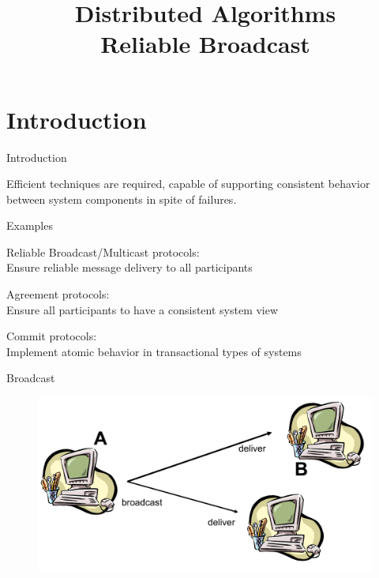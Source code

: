 
\title[DS - Reliable Broadcast]{\textbf{Distributed Algorithms}\\Reliable Broadcast}

\graphicspath{{figs/04/}}



\FrameTitle{}
\FrameContent

\section{Introduction}

\begin{frame}{Introduction}

Efficient techniques are required, capable of supporting consistent behavior 
between system components in spite of failures.

\bigskip
\begin{block}{Examples}
\BIL
\item  \alert{Reliable Broadcast/Multicast protocols}:\\
Ensure reliable message delivery to all participants 
\item Agreement protocols:\\
Ensure all participants to have a consistent system view 
\item Commit protocols:\\
Implement atomic behavior in transactional types of systems
\EIL
\end{block}

\end{frame}

\begin{frame}{Broadcast}
	
\begin{figure}
\includegraphics[width=\textwidth]{rb-example}
\end{figure}

\end{frame}

